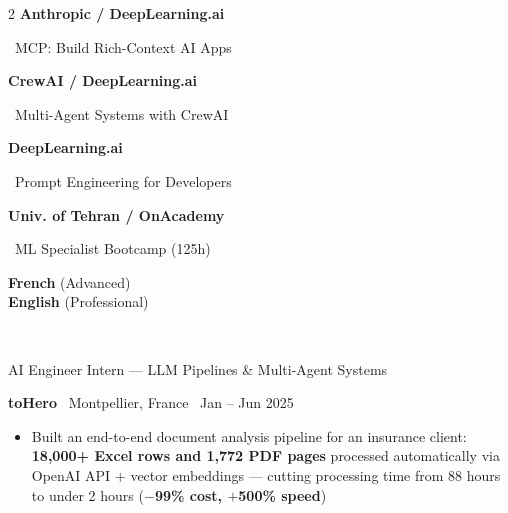 \documentclass[7pt,a4paper,withhyper]{altacv}
\renewcommand{\cvevent}[4]{%
  {\large\color{emphasis}\raggedright #1\par}
  \smallskip\normalsize
  \ifstrequal{#2}{}{}{%
    \textbf{\color{accent}#2}%
  }%
  \ifstrequal{#4}{}{}{%
    \ifstrequal{#2}{}{}{\hspace{1.5em}}%
    {\small\cvLocationMarker~#4}%
  }%
  \ifstrequal{#3}{}{}{%
    \hfill{\small\cvDateMarker~#3}%
  }\par
}
\begin{document}
\begin{paracol}{2}
\vspace{0.2em}
\smallskip
\noindent\textbf{Anthropic / DeepLearning.ai}\par
\hspace{1em}\raisebox{0.15ex}{\textcolor{accent}{\scriptsize\faStar}}~MCP: Build Rich-Context AI Apps\par
\vspace{0.2em}
\noindent\textbf{CrewAI / DeepLearning.ai}\par
\hspace{1em}\raisebox{0.15ex}{\textcolor{accent}{\scriptsize\faStar}}~Multi-Agent Systems with CrewAI\par
\vspace{0.2em}
\noindent\textbf{DeepLearning.ai}\par
\hspace{1em}\raisebox{0.15ex}{\textcolor{accent}{\scriptsize\faStar}}~Prompt Engineering for Developers\par
\vspace{0.2em}
\noindent\textbf{Univ. of Tehran / OnAcademy}\par
\hspace{1em}\raisebox{0.15ex}{\textcolor{accent}{\scriptsize\faStar}}~ML Specialist Bootcamp (125h)\par
\hspace{1em}{Python ML · Neural Networks · CV}\par

\vspace{0.2em}
\textbf{French} (Advanced)\\\vspace{0.1em}
\textbf{English} (Professional)\\\vspace{0.1em}\par

\vspace{0.2em}
 \\[-0.15em]
 \par

\switchcolumn
\vspace{-0.5em}


\cvevent{AI Engineer Intern — LLM Pipelines \& Multi-Agent Systems}{toHero}{Jan – Jun 2025}{Montpellier, France}
\smallskip
\begin{itemize}[leftmargin=1.25em, itemsep=0pt, parsep=0pt]
\item \justifying Built an end-to-end document analysis pipeline for an insurance client: \textbf{18,000+ Excel rows and 1,772 PDF pages} processed automatically via OpenAI API + vector embeddings — cutting processing time from 88 hours to under 2 hours (\textbf{$-$99\% cost, $+$500\% speed})


\end{itemize}
\end{paracol}
\end{document}
